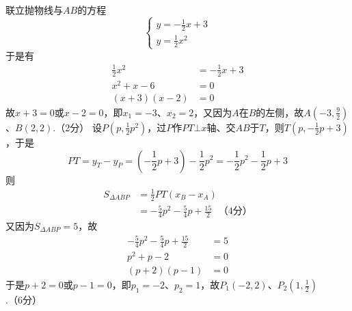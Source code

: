 \documentclass[10pt]{article}
\begin{document}
\begin{questions}{\answeringintroduction}
    \question %
    \begin{subquestions}
        \subquestion 联立抛物线与$AB$的方程
        $$\begin{cases}
            y = -\frac{1}{2}x+3 \\
            y = \frac{1}{2}x^2
        \end{cases}$$
        于是有
        $$\begin{aligned}
            \frac{1}{2}x^2 &= -\frac{1}{2}x+3 \\
            x^2+x-6 &= 0 \\
            (x+3)(x-2) &= 0
        \end{aligned}$$
        故$x+3=0$或$x-2=0$，即$x_1=-3$、$x_2=2$，又因为$A$在$B$的左侧，故$A\left(-3,\frac{9}{2}\right)$、$B(2,2)$.（2分）
        \subquestion 设$P\left(p,\frac{1}{2}p^2\right)$，过$P$作$PT \bot x$轴、交$AB$于$T$，则$T\left(p,-\frac{1}{2}p+3\right)$，于是$$PT = y_T - y_P = \left(-\frac{1}{2}p+3\right) - \frac{1}{2}p^2 = -\frac{1}{2}p^2 - \frac{1}{2}p + 3$$
        则
        $$\begin{aligned}
            S_{\Delta ABP} &= \frac{1}{2}PT(x_B - x_A) \\
                           &= -\frac{5}{4}p^2 - \frac{5}{4}p + \frac{15}{2} \ \ \ （4分）
        \end{aligned}$$
        又因为$S_{\Delta ABP} = 5$，故
        $$\begin{aligned}
            -\frac{5}{4}p^2 - \frac{5}{4}p + \frac{15}{2} &= 5 \\
            p^2+p-2 &= 0 \\
            (p+2)(p-1) &= 0
        \end{aligned}$$
        于是$p+2=0$或$p-1=0$，即$p_1=-2$、$p_2=1$，故$P_1(-2,2)$、$P_2\left(1,\frac{1}{2}\right)$.（6分）
        \begin{figure}[!htb]
            \raggedleft
\end{figure}
\end{subquestions}
\end{questions}
\end{document}
